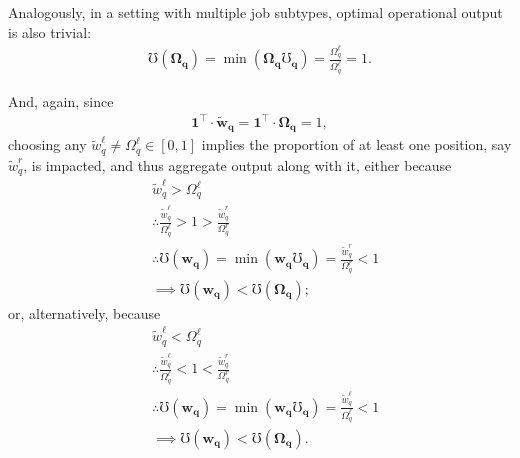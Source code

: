 \documentclass[hidelinks, nonatbib]{elsarticle}
\begin{document}
\begin{enumerate}
    Analogously, in a setting with multiple job subtypes, optimal operational output is also trivial:
    \begin{gather}
        \mho(\boldsymbol{\Omega_q})
        = 
        \min(
            \boldsymbol{\Omega_q}
            \boldsymbol{\mho_q}
        )
        =
        \frac{
            \Omega_{q}^{\ell}
        }{
            \Omega_{q}^{\ell}
        }
        =
        1
        .
    \end{gather}

    And, again, since
    \begin{gather}
        \boldsymbol{1} ^ {\top}
        \cdot
        \boldsymbol{\tilde{w}_{q}}
        =
        \boldsymbol{1} ^ {\top}
        \cdot
        \boldsymbol{\Omega_{q}}
        = 1
        ,
    \end{gather}
    choosing any $\tilde{w}_{q}^{\ell} \neq \Omega_{q}^{\ell} \in [0,1]$ implies the proportion of at least one position, say $\tilde{w}_{q}^{r}$, is impacted, and thus aggregate output along with it, either because
    \begin{align}
        &
        \tilde{w}_{q}^{\ell} > \Omega_{q}^{\ell}
        \\
        &\therefore
        \frac{
            \tilde{w}_{q}^{\ell}
        }{
            \Omega_{q}^{\ell}
        }
        > 
        1
        > 
        \frac{
            \tilde{w}_{q}^{r}
        }{
            \Omega_{q}^{r}
        }
        \\
        &\therefore
        \mho(\boldsymbol{w_q})
        = 
        \min(
            \boldsymbol{w_q}
            \boldsymbol{\mho_q}
        )
        =
        \frac{
            \tilde{w}_{q}^{r}
        }{
            \Omega_{q}^{r}
        }
        < 
        1
        \\
        &\implies
        \mho(\boldsymbol{w_q})
        <
        \mho(\boldsymbol{\Omega_q})
        ;
    \end{align}
    or, alternatively, because
    \begin{align}
        &
        \tilde{w}_{q}^{\ell} < \Omega_{q}^{\ell}
        \\
        &\therefore
        \frac{
            \tilde{w}_{q}^{\ell}
        }{
            \Omega_{q}^{\ell}
        }
        < 
        1
        < 
        \frac{
            \tilde{w}_{q}^{r}
        }{
            \Omega_{q}^{r}
        }
        \\
        &\therefore
        \mho(\boldsymbol{w_q})
        = 
        \min(
            \boldsymbol{w_q}
            \boldsymbol{\mho_q}
        )
        =
        \frac{
            \tilde{w}_{q}^{\ell}
        }{
            \Omega_{q}^{\ell}
        }
        < 
        1
        \\
        &\implies
        \mho(\boldsymbol{w_q})
        <
        \mho(\boldsymbol{\Omega_q})
        .
    \end{align}


\end{enumerate}
\end{document}
